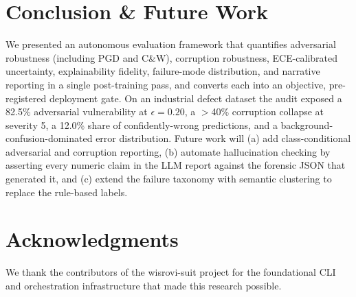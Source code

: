 \documentclass[10pt,twocolumn,letterpaper]{article}
\begin{document}
\section{Conclusion \& Future Work}
\label{sec:conclusion}
We presented an autonomous evaluation framework that quantifies adversarial robustness (including PGD and C\&W), corruption robustness, ECE-calibrated uncertainty, explainability fidelity, failure-mode distribution, and narrative reporting in a single post-training pass, and converts each into an objective, pre-registered deployment gate. On an industrial defect dataset the audit exposed a 82.5\% adversarial vulnerability at $\epsilon=0.20$, a $>$40\% corruption collapse at severity 5, a 12.0\% share of confidently-wrong predictions, and a background-confusion-dominated error distribution. Future work will (a) add class-conditional adversarial and corruption reporting, (b) automate hallucination checking by asserting every numeric claim in the LLM report against the forensic JSON that generated it, and (c) extend the failure taxonomy with semantic clustering to replace the rule-based labels.

\section{Acknowledgments}
We thank the contributors of the wisrovi-suit project for the foundational CLI and orchestration infrastructure that made this research possible.



\end{document}
